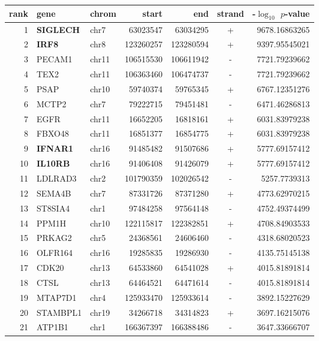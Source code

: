 \begin{table}
\small \centering 
 \begin{tabular}{rllrrcr}
rank & gene & chrom & start & end & strand & -$\log_{10}$ $p$-value \\\hline
1 & \textbf{SIGLECH} & chr7 & 63023547 & 63034295 & + & 9678.16863265 \\
2 & \textbf{IRF8} & chr8 & 123260257 & 123280594 & + & 9397.95545021 \\
3 & PECAM1 & chr11 & 106515530 & 106611942 & - & 7721.79239662 \\
4 & TEX2 & chr11 & 106363460 & 106474737 & - & 7721.79239662 \\
5 & PSAP & chr10 & 59740374 & 59765345 & + & 6767.12351276 \\
6 & MCTP2 & chr7 & 79222715 & 79451481 & - & 6471.46286813 \\
7 & EGFR & chr11 & 16652205 & 16818161 & + & 6031.83979238 \\
8 & FBXO48 & chr11 & 16851377 & 16854775 & + & 6031.83979238 \\
9 & \textbf{IFNAR1} & chr16 & 91485482 & 91507686 & + & 5777.69157412 \\
10 & \textbf{IL10RB} & chr16 & 91406408 & 91426079 & + & 5777.69157412 \\
11 & LDLRAD3 & chr2 & 101790359 & 102026542 & - & 5257.7739313 \\
12 & SEMA4B & chr7 & 87331726 & 87371280 & + & 4773.62970215 \\
13 & ST8SIA4 & chr1 & 97484258 & 97564148 & - & 4752.49374499 \\
14 & PPM1H & chr10 & 122115817 & 122382851 & + & 4708.84903533 \\
15 & PRKAG2 & chr5 & 24368561 & 24606460 & - & 4318.68020523 \\
16 & OLFR164 & chr16 & 19285835 & 19286930 & - & 4135.75145138 \\
17 & CDK20 & chr13 & 64533860 & 64541028 & + & 4015.81891814 \\
18 & CTSL & chr13 & 64464521 & 64471614 & - & 4015.81891814 \\
19 & MTAP7D1 & chr4 & 125933470 & 125933614 & - & 3892.15227629 \\
20 & STAMBPL1 & chr19 & 34266718 & 34314823 & + & 3697.16215076 \\
21 & ATP1B1 & chr1 & 166367397 & 166388486 & - & 3647.33666707 \\

\end{tabular}
\end{table}

